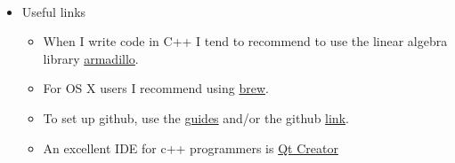 \documentclass[%
oneside,                 %
final,                   %
10pt]{article}
\begin{document}
\paragraph{}
\begin{itemize}
\item Useful links
\begin{itemize}

 \item When I write code in C++ I tend to recommend to use the linear algebra library \href{{http://arma.sourceforge.net/}}{armadillo}. 

 \item For OS X users I recommend using \href{{http://brew.sh/}}{brew}.

 \item To set up github, use the \href{{https://guides.github.com/}}{guides} and/or the github \href{{https://github.com/}}{link}. 

 \item An excellent IDE for c++ programmers is \href{{http://www.qt.io/ide/}}{Qt Creator}
\end{itemize}

\noindent
\end{itemize}

\noindent



\end{document}
